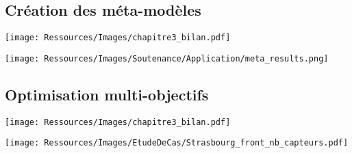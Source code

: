 \documentclass[xcolor=x11names, compress, 11pt]{beamer}
\begin{document}
\subsection{Création des méta-modèles}
\begin{frame}[t]
    \vfill
    \centering
    \texttt{[image: Ressources/Images/chapitre3\_bilan.pdf]}
    \vfill
\end{frame}

\begin{frame}[c]
    \vfill
    \texttt{[image: Ressources/Images/Soutenance/Application/meta\_results.png]}
    \vfill
    \vfill
\end{frame}



\subsection{Optimisation multi-objectifs}
\begin{frame}[t]
    \vfill
    \centering
    \texttt{[image: Ressources/Images/chapitre3\_bilan.pdf]}
    \vfill
\end{frame}


\begin{frame}[c]
    \vfill
    \texttt{[image: Ressources/Images/EtudeDeCas/Strasbourg\_front\_nb\_capteurs.pdf]}
    \vfill
\end{frame}


\begin{frame}[c]
    \vfill
    \centering

    \vfill

\end{frame}
\end{document}
